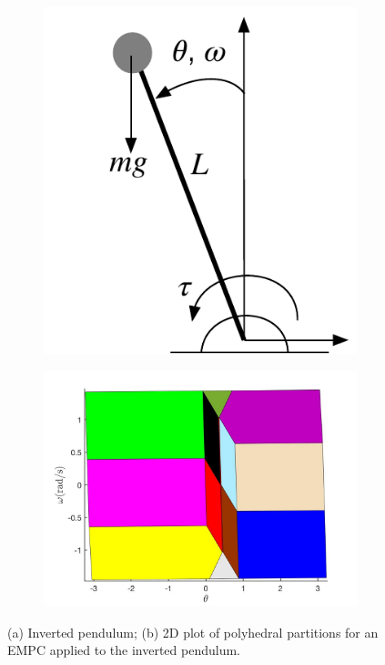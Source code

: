 \begin{figure}[t]
	\centering
  \begin{subfigure}[b]{0.33\columnwidth}
      \includegraphics[width=\textwidth]{Figs/inverted_pendulum.pdf}
      \vspace{0.05cm}
      \caption{}
  \end{subfigure}
  \begin{subfigure}[b]{0.66\columnwidth}
      \includegraphics[width=\textwidth]{Figs/regs.jpg}
      \caption{}
  \end{subfigure}
	\caption{(a) Inverted pendulum; (b) 2D plot of polyhedral partitions for an EMPC applied to the inverted pendulum.}
	\label{fig:inverted_pendulum}
\end{figure}

